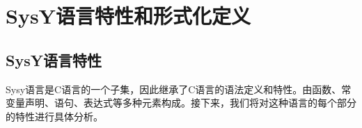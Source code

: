 \documentclass[UTF8,a4paper,10pt]{ctexart}
\begin{document}



    





\section{SysY语言特性和形式化定义}
\subsection{SysY语言特性}
Sysy语言是C语言的一个子集，因此继承了C语言的语法定义和特性。由函数、常变量声明、语句、表达式等多种元素构成。接下来，我们将对这种语言的每个部分的特性进行具体分析。
\end{document}
